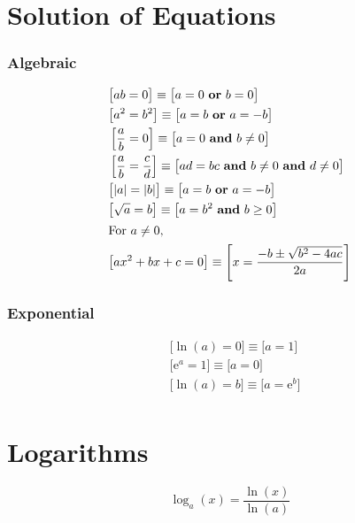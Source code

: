 \documentclass[letterpaper,landscape,9pt,fleqn]{extarticle}
\newcommand{\euler}{\mathrm{e}}
\begin{document}
\begin{multicols*}{3}
\section*{Solution of Equations}
\subsubsection*{Algebraic}
\begin{minipage}[c]{0.3333333333333\textwidth}
\begin{align*}
& \big [a b = 0 \big ] \equiv \big [ a = 0 \mbox{ \textbf{or} } b = 0 \big ]\\
& \big [ a^2 = b^2 \big ] \equiv \big [ a = b \mbox{ \textbf{or} } a = -b \big ]\\
&\left [ \frac{a}{b} = 0 \right ] \equiv \big [ a = 0 \mbox{ \textbf{and} } b \neq 0 \big ] \\
&\left [\frac{a}{b} = \frac{c}{d}  \right ] \equiv \big [ad  = bc \mbox{ \textbf{and}  } b \neq 0  \mbox{ \textbf{and}  }  d \neq 0 \big ] \\
&\big [|a| = |b|  \big ] \equiv \big [a =b \mbox{ \textbf{or} } a = -b \big ]\\
&\big [ \sqrt{a}  = b \big ] \equiv \big [a = b^2 \mbox{ \textbf{and}  } b \ge 0 \big ] \\
\intertext{For \(a \neq 0\),}
& \big [a x^2 + b x + c = 0 \big] \equiv \left [x = \frac{-b \pm \sqrt{b^2 - 4 a c}}{2 a} \right] \\
\end{align*}
\subsubsection*{Exponential}
\begin{align*}
& \big [\ln(a) = 0 \big] \equiv \big [a =  1\big] \\
& \big [\euler^a = 1 \big] \equiv \big [a = 0 \big] \\
& \big [\ln(a) = b \big] \equiv \big [a = \euler^b \big] \\
\end{align*}
\end{minipage}
\section*{Logarithms}
   \begin{equation*}
  \log_a(x) = \frac{\ln(x)}{\ln(a)}
     \end{equation*}
\vfill


\end{multicols*}
\end{document}
